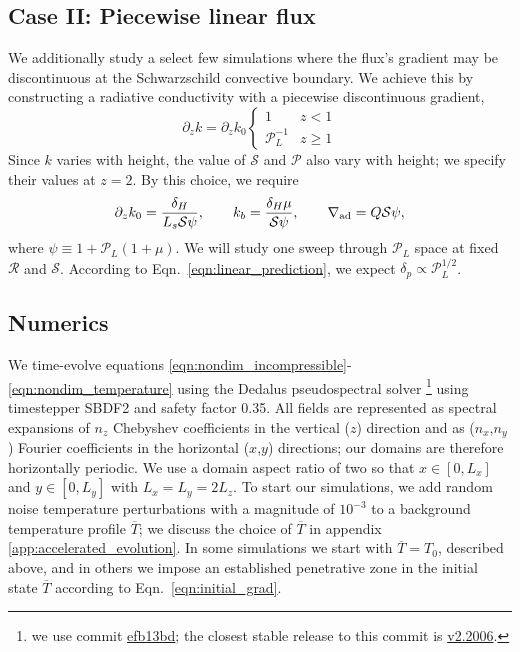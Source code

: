\documentclass[twocolumn]{aastex631}
\newcommand{\gradad}{\ensuremath{\nabla_{\rm{ad}}}}
\newcommand{\mP}{\ensuremath{\mathcal{P}}}
\newcommand{\mR}{\ensuremath{\mathcal{R}}}
\newcommand{\mS}{\ensuremath{\mathcal{S}}}
\renewcommand{\bar}[1]{\overline{#1}}
\begin{document}
\subsection{Case II: Piecewise linear flux}
We additionally study a select few simulations where the flux's gradient may be discontinuous at the Schwarzschild convective boundary.
We achieve this by constructing a radiative conductivity with a piecewise discontinuous gradient,
\begin{equation}
\partial_z k = \partial_z k_0
\begin{cases}
1	&	z < 1 \\
\mP_L^{-1} &	z \geq 1
\end{cases}
\label{eqn:sim_linear_k}
\end{equation}
Since $k$ varies with height, the value of $\mS$ and $\mP$ also vary with height; we specify their values at $z = 2$.
By this choice, we require
\begin{equation}
\partial_z k_0 = \frac{\delta_H}{L_s \mS \psi},\qquad
k_b = \frac{\delta_H\mu}{\mS\psi},\qquad
\gradad = Q \mS \psi,
\end{equation}
where $\psi \equiv 1 + \mP_L(1 + \mu)$.
We will study one sweep through $\mP_L$ space at fixed $\mR$ and $\mS$.
According to Eqn.~\ref{eqn:linear_prediction}, we expect $\delta_p \propto \mP_L^{1/2}$.

\subsection{Numerics}
\label{sct:numerics}
We time-evolve equations \ref{eqn:nondim_incompressible}-\ref{eqn:nondim_temperature} using the Dedalus pseudospectral solver \citep{burns_etal_2020}\footnote{we use commit \href{https://github.com/DedalusProject/dedalus/commit/efb13bdaa09816dde3eee897bc2a15fc284ea2f1}{efb13bd}; the closest stable release to this commit is \href{https://github.com/DedalusProject/dedalus/releases/tag/v2.2006}{v2.2006}.} using timestepper SBDF2 \citep{wang&ruuth2008} and safety factor 0.35.
All fields are represented as spectral expansions of $n_z$ Chebyshev coefficients in the vertical ($z$) direction and as ($n_x$,$n_y$) Fourier coefficients in the horizontal ($x$,$y$) directions; our domains are therefore horizontally periodic.
We use a domain aspect ratio of two so that $x \in [0, L_x]$ and $y \in [0, L_y]$ with $L_x = L_y = 2 L_z$.
To start our simulations, we add random noise temperature perturbations with a magnitude of $10^{-3}$ to a background temperature profile $\overline{T}$; we discuss the choice of $\overline{T}$ in appendix \ref{app:accelerated_evolution}.
In some simulations we start with $\bar{T} = T_0$, described above, and in others we impose an established penetrative zone in the initial state $\bar{T}$ according to Eqn.~\ref{eqn:initial_grad}.
\end{document}
